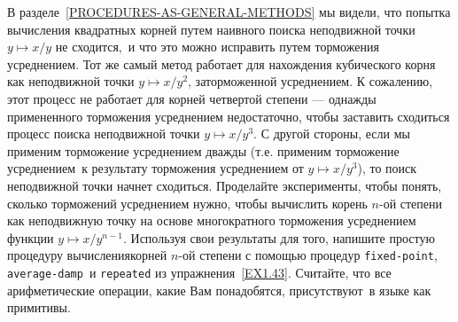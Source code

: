 \begin{exercise}{1.45}\label{EX1.45}%
В разделе~\ref{PROCEDURES-AS-GENERAL-METHODS} мы видели, что
попытка вычисления квадратных корней путем наивного поиска неподвижной 
точки $y \mapsto x / y$ не сходится,~и что это можно
исправить путем торможения усреднением.  Тот же самый метод работает
для нахождения кубического корня как неподвижной точки $y \mapsto 
x / y^2$, заторможенной усреднением. К сожалению, этот
процесс не работает для 
корней четвертой степени --- однажды
примененного торможения усреднением недостаточно, чтобы заставить
сходиться процесс поиска неподвижной точки $y \mapsto x /
y^3$. С другой стороны, если мы применим торможение усреднением 
дважды (т.е. применим торможение усреднением~к результату торможения
усреднением от $y \mapsto x / y^3$), то поиск
неподвижной точки начнет сходиться.  Проделайте эксперименты, чтобы
понять, сколько торможений усреднением нужно, чтобы вычислить 
корень $n$-ой степени как неподвижную точку на основе
многократного торможения усреднением функции $y \mapsto x /
y^{n-1}$.  Используя свои результаты для того, напишите
простую процедуру вычислениякорней $n$-ой степени с
помощью процедур {\tt fixed-point}, {\tt average-damp}~и 
{\tt repeated} из упражнения~\ref{EX1.43}.  Считайте, 
что все арифметические операции, какие Вам понадобятся, присутствуют~в 
языке как примитивы.
\end{exercise}

